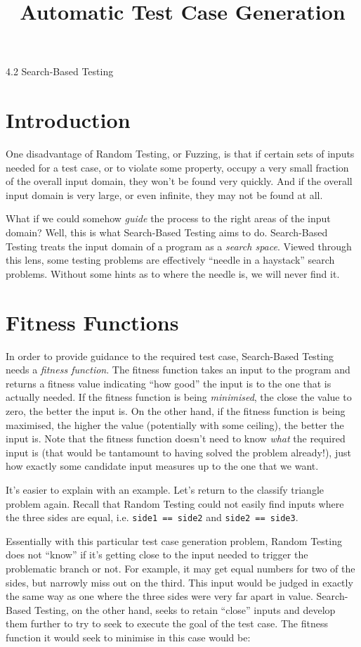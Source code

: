 



\title{Automatic Test Case Generation}{4.2 Search-Based Testing}

\section{Introduction}

One disadvantage of Random Testing, or Fuzzing, is that if certain sets of
inputs needed for a test case, or to violate some property, occupy a very small
fraction of the overall input domain, they won't be found very quickly. And if
the overall input domain is very large, or even infinite, they may not be found
at all.

What if we could somehow {\it guide} the process to the right areas of the input
domain? Well, this is what Search-Based Testing aims to do. Search-Based Testing
treats the input domain of a program as a {\it search space}. Viewed through
this lens, some testing problems are effectively ``needle in a haystack'' search
problems. Without some hints as to where the needle is, we will never find it.

\section{Fitness Functions}
In order to provide guidance to the required test case, Search-Based Testing
needs a {\it fitness function}. The fitness function takes an input to the
program and returns a {fitness value} indicating ``how good'' the input is to
the one that is actually needed. If the fitness function is being {\it
minimised}, the close the value to zero, the better the input is. On the other
hand, if the fitness function is being maximised, the higher the value
(potentially with some ceiling), the better the input is.
%
Note that the fitness function doesn't need to know {\it what} the required
input is (that would be tantamount to having solved the problem already!), just
how exactly some candidate input measures up to the one that we want.

It's easier to explain with an example. Let's return to the classify triangle
problem again. Recall that Random Testing could not easily find inputs where the
three sides are equal, i.e. {\tt side1 == side2} and {\tt side2 == side3}.

Essentially with this particular test case generation problem, Random Testing
does not ``know'' if it's getting close to the input needed to trigger the
problematic branch or not. For example, it may get equal numbers for two of the
sides, but narrowly miss out on the third. This input would be judged in exactly
the same way as one where the three sides were very far apart in value.
Search-Based Testing, on the other hand, seeks to retain ``close'' inputs and
develop them further to try to seek to execute the goal of the test case. The
fitness function it would seek to minimise in this case would be:

